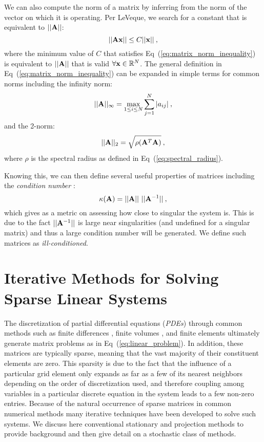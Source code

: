 We can also compute the norm of a matrix by inferring from the norm of
the vector on which it is operating. Per LeVeque, we search for a
constant that is equivalent to $||\mathbf{A}||$:
\begin{equation}
  ||\mathbf{A}\mathbf{x}|| \leq C ||\mathbf{x}||\:,
  \label{eq:matrix_norm_inequality}
\end{equation}
where the minimum value of $C$ that satisfies
Eq~(\ref{eq:matrix_norm_inequality}) is equivalent to $||\mathbf{A}||$
that is valid $\forall \mathbf{x} \in \mathbb{R}^N$. The general
definition in Eq~(\ref{eq:matrix_norm_inequality}) can be expanded in
simple terms for common norms including the infinity norm:
\begin{equation}
  ||\mathbf{A}||_{\infty} = \max_{1 \leq i \leq N} \sum^N_{j=1}|a_{ij}|\:,
  \label{eq:matrix_infinity_norm}
\end{equation}
and the 2-norm:
\begin{equation}
  ||\mathbf{A}||_{2} = \sqrt{\rho(\mathbf{A}^T\mathbf{A})}\:,
  \label{eq:matrix_2_norm}
\end{equation}
where $\rho$ is the spectral radius as defined in
Eq~(\ref{eq:spectral_radius}).

Knowing this, we can then define several useful properties of matrices
including the \textit{condition number} \citep{saad_2003}:
\begin{equation}
  \kappa(\mathbf{A}) = ||\mathbf{A}||\ ||\mathbf{A}^{-1}||\:,
  \label{eq:condition_number}
\end{equation}
which gives as a metric on assessing how close to singular the system
is. This is due to the fact $||\mathbf{A}^{-1}||$ is large near
singularities (and undefined for a singular matrix) and thus a large
condition number will be generated. We define such matrices as
\textit{ill-conditioned}. 

\section{Iterative Methods for Solving Sparse Linear Systems}
\label{sec:linear_methods}
The discretization of partial differential equations (\textit{PDEs})
through common methods such as finite differences
\citep{leveque_2007}, finite volumes \citep{leveque_2002}, and finite
elements \citep{zienkiewicz_1977} ultimately generate matrix problems
as in Eq~(\ref{eq:linear_problem}).  In addition, these matrices are
typically sparse, meaning that the vast majority of their constituent
elements are zero. This sparsity is due to the fact that the influence
of a particular grid element only expands as far as a few of its
nearest neighbors depending on the order of discretization used, and
therefore coupling among variables in a particular discrete equation
in the system leads to a few non-zero entries. Because of the natural
occurrence of sparse matrices in common numerical methods many
iterative techniques have been developed to solve such systems. We
discuss here conventional stationary and projection methods to provide
background and then give detail on a stochastic class of methods.

